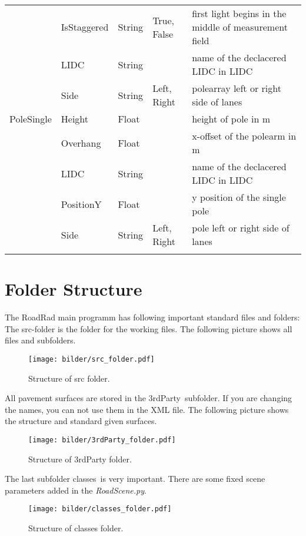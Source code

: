 \documentclass[10pt,a4paper]{report}
\newcommand{\mymidrule}{\specialrule{0.1em}{0em}{0em}}
\newcommand{\mybottomrule}{\specialrule{0.2em}{0em}{0em}}
\begin{document}
\begin{landscape}
\begin{longtable}{lllp{4cm}p{6cm}}
		 & IsStaggered & String & True, False & first light begins in the middle of measurement field \\\rowcolor{hellgrau}
		 & LIDC & String & & name of the declacered LIDC in LIDC \\\rowcolor{hellgrau}
		 & Side & String & Left, Right & polearray left or right side of lanes \\
	\mymidrule
		PoleSingle & Height & Float & & height of pole in m \\
		 & Overhang & Float & & x-offset of the polearm in m \\
		 & LIDC & String & & name of the declacered LIDC in LIDC \\
		 & PositionY & Float & & y position of the single pole \\ 
		 & Side & String & Left, Right & pole left or right side of lanes \\
	\mybottomrule
	\end{longtable} 

\end{landscape}

\chapter{Folder Structure}
\label{chap:folder_struc}

The RoadRad main programm has following important standard files and folders:
The src-folder is the folder for the working files. The following picture shows all files and subfolders.
\begin{figure}[H]
\texttt{[image: bilder/src\_folder.pdf]} 
\caption{Structure of src folder.}
\end{figure}

All pavement surfaces are stored in the \glqq 3rdParty\grqq\ subfolder. If you are changing the names, you can not use them in the XML file. The following picture shows the structure and standard given surfaces.
\begin{figure}[H]
\texttt{[image: bilder/3rdParty\_folder.pdf]} 
\caption{Structure of 3rdParty folder.}
\end{figure}

The last subfolder \glqq classes\grqq\ is very important. There are some fixed scene parameters added in the \textit{RoadScene.py}.
\begin{figure}[H]
\texttt{[image: bilder/classes\_folder.pdf]} 
\caption{Structure of classes folder.}
\end{figure}
\end{document}
